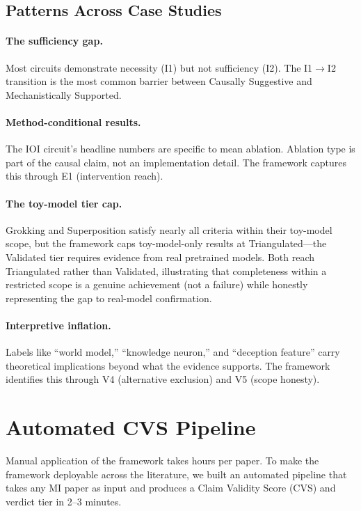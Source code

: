\documentclass[10pt]{article}
\begin{document}
\subsection{Patterns Across Case Studies}

\paragraph{The sufficiency gap.} Most circuits demonstrate necessity (I1) but not sufficiency (I2). The I1$\rightarrow$I2 transition is the most common barrier between Causally Suggestive and Mechanistically Supported.

\paragraph{Method-conditional results.} The IOI circuit's headline numbers are specific to mean ablation. Ablation type is part of the causal claim, not an implementation detail. The framework captures this through E1 (intervention reach).

\paragraph{The toy-model tier cap.} Grokking and Superposition satisfy nearly all criteria within their toy-model scope, but the framework caps toy-model-only results at Triangulated---the Validated tier requires evidence from real pretrained models. Both reach Triangulated rather than Validated, illustrating that completeness within a restricted scope is a genuine achievement (not a failure) while honestly representing the gap to real-model confirmation.

\paragraph{Interpretive inflation.} Labels like ``world model,'' ``knowledge neuron,'' and ``deception feature'' carry theoretical implications beyond what the evidence supports. The framework identifies this through V4 (alternative exclusion) and V5 (scope honesty).

\section{Automated CVS Pipeline}
\label{sec:pipeline}

Manual application of the framework takes hours per paper. To make the framework deployable across the literature, we built an automated pipeline that takes any MI paper as input and produces a Claim Validity Score (CVS) and verdict tier in 2--3 minutes.
\end{document}
